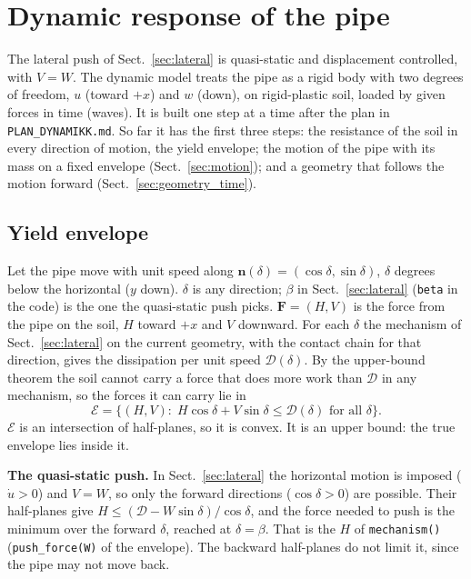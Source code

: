 \documentclass[11pt,a4paper]{article}
\begin{document}
\section{Dynamic response of the pipe}
\label{sec:dynamic}

The lateral push of Sect.~\ref{sec:lateral} is quasi-static and
displacement controlled, with $V = W$.  The dynamic model treats the
pipe as a rigid body with two degrees of freedom, $u$ (toward $+x$)
and $w$ (down), on rigid-plastic soil, loaded by given forces in time
(waves).  It is built one step at a time after the plan in
\texttt{PLAN\_DYNAMIKK.md}.  So far it has the first three steps: the
resistance of the soil in every direction of motion, the yield
envelope; the motion of the pipe with its mass on a fixed envelope
(Sect.~\ref{sec:motion}); and a geometry that follows the motion
forward (Sect.~\ref{sec:geometry_time}).

\subsection{Yield envelope}
\label{sec:envelope}

Let the pipe move with unit speed along
$\mathbf{n}(\delta) = (\cos\delta, \sin\delta)$, $\delta$ degrees below
the horizontal ($y$ down).  $\delta$ is any direction; $\beta$ in
Sect.~\ref{sec:lateral} (\texttt{beta} in the code) is the one the
quasi-static push picks.  $\mathbf{F} = (H, V)$ is the force from the
pipe on the soil, $H$ toward $+x$ and $V$ downward.  For each $\delta$
the mechanism of Sect.~\ref{sec:lateral} on the current geometry, with
the contact chain for that direction, gives the dissipation per unit
speed $\mathcal{D}(\delta)$.  By the upper-bound theorem the soil
cannot carry a force that does more work than $\mathcal{D}$ in any
mechanism, so the forces it can carry lie in
\begin{equation}
  \mathcal{E} = \bigl\{(H, V) :\;
  H\cos\delta + V\sin\delta \le \mathcal{D}(\delta)
  \text{ for all } \delta\bigr\}.
  \label{eq:envelope}
\end{equation}
$\mathcal{E}$ is an intersection of half-planes, so it is convex.  It
is an upper bound: the true envelope lies inside it.

\textbf{The quasi-static push.}  In Sect.~\ref{sec:lateral} the
horizontal motion is imposed ($\dot u > 0$) and $V = W$, so only the
forward directions ($\cos\delta > 0$) are possible.  Their half-planes
give $H \le (\mathcal{D} - W\sin\delta)/\cos\delta$, and the force
needed to push is the minimum over the forward $\delta$, reached at
$\delta = \beta$.  That is the $H$ of \texttt{mechanism()}
(\texttt{push\_force(W)} of the envelope).  The backward half-planes do
not limit it, since the pipe may not move back.
\end{document}
